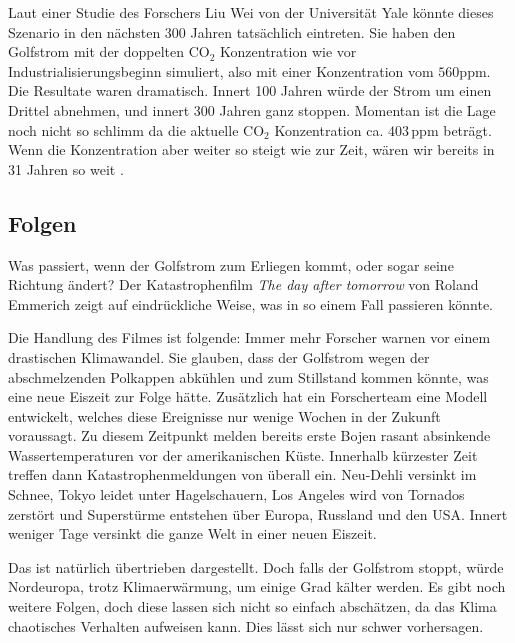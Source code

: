 Laut einer Studie des Forschers Liu Wei von der Universität Yale
\cite{thermohalin:liuwei} könnte dieses Szenario in den nächsten 300 Jahren tatsächlich eintreten. Sie haben den Golfstrom mit der doppelten $\text{CO}_2$ Konzentration wie vor Industrialisierungsbeginn simuliert, also mit einer Konzentration vom $560\text{ppm}$. Die Resultate waren dramatisch. Innert 100 Jahren würde der Strom um einen Drittel abnehmen, und innert 300 Jahren ganz stoppen. Momentan ist die Lage noch nicht so schlimm da die aktuelle $\text{CO}_2$ Konzentration ca. $403\,\text{ppm}$ \cite{thermohalin:co2} beträgt. Wenn die Konzentration aber weiter so steigt wie zur Zeit, wären wir bereits in 31 Jahren so weit .

\subsection{Folgen}

Was passiert, wenn der Golfstrom zum Erliegen kommt, oder sogar seine Richtung ändert?
Der Katastrophenfilm {\em The day after tomorrow} von Roland Emmerich zeigt auf eindrückliche Weise, was in so einem Fall passieren könnte. 

Die Handlung des Filmes ist folgende: Immer mehr Forscher warnen vor einem drastischen Klimawandel. Sie glauben, dass der Golfstrom wegen der abschmelzenden Polkappen abkühlen und zum Stillstand kommen könnte, was eine neue Eiszeit zur Folge hätte. Zusätzlich hat ein Forscherteam eine Modell entwickelt, welches diese Ereignisse nur wenige Wochen in der Zukunft voraussagt. Zu diesem Zeitpunkt melden bereits erste Bojen rasant absinkende Wassertemperaturen vor der amerikanischen Küste. Innerhalb kürzester Zeit treffen dann Katastrophenmeldungen von überall ein. Neu-Dehli versinkt im Schnee, Tokyo leidet unter Hagelschauern, Los Angeles wird von Tornados zerstört und Superstürme entstehen über Europa, Russland und den USA. 
Innert weniger Tage versinkt die ganze Welt in einer neuen Eiszeit. 

Das ist natürlich übertrieben dargestellt. Doch falls der Golfstrom stoppt, würde Nordeuropa, trotz Klimaerwärmung, um einige Grad kälter werden. Es gibt noch weitere Folgen, doch diese lassen sich nicht so einfach abschätzen, da das Klima chaotisches Verhalten aufweisen kann. Dies lässt sich nur schwer vorhersagen.

